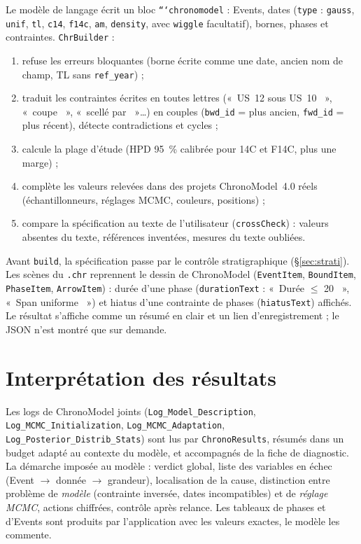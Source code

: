 \documentclass[11pt,a4paper]{article}
\providecommand{\og}{«~}\providecommand{\fg}{\unskip~»}
\newcommand{\code}[1]{\texttt{\small #1}}
\begin{document}
Le modèle de langage écrit un bloc \code{```chronomodel} : Events, dates (\code{type} : \code{gauss}, \code{unif},
\code{tl}, \code{c14}, \code{f14c}, \code{am}, \code{density}, avec \code{wiggle} facultatif), bornes, phases et
contraintes. \code{ChrBuilder} :
\begin{enumerate}[leftmargin=*]
\item refuse les erreurs bloquantes (borne écrite comme une date, ancien nom de champ, TL sans \code{ref\_year}) ;
\item traduit les contraintes écrites en toutes lettres (\og US~12 sous US~10 \fg, \og coupe \fg, \og scellé par
  \fg\dots) en couples (\code{bwd\_id} = plus ancien, \code{fwd\_id} = plus récent), détecte contradictions et cycles ;
\item calcule la plage d'étude (HPD 95~\% calibrée pour 14C et F14C, plus une marge) ;
\item complète les valeurs relevées dans des projets ChronoModel~4.0 réels (échantillonneurs, réglages MCMC,
  couleurs, positions) ;
\item compare la spécification au texte de l'utilisateur (\code{crossCheck}) : valeurs absentes du texte,
  références inventées, mesures du texte oubliées.
\end{enumerate}
Avant \code{build}, la spécification passe par le contrôle stratigraphique (§\ref{sec:strati}). Les scènes du
\code{.chr} reprennent le dessin de ChronoModel (\code{EventItem}, \code{BoundItem}, \code{PhaseItem},
\code{ArrowItem}) : durée d'une phase (\code{durationText} : \og Durée $\le$ 20 \fg, \og Span uniforme \fg) et hiatus
d'une contrainte de phases (\code{hiatusText}) affichés.
Le résultat s'affiche comme un résumé en clair et un lien d'enregistrement ; le JSON n'est montré que sur demande.

\section{Interprétation des résultats}

Les logs de ChronoModel joints (\code{Log\_Model\_Description}, \code{Log\_MCMC\_Initialization},
\code{Log\_MCMC\_Adaptation}, \code{Log\_Posterior\_Distrib\_Stats}) sont lus par \code{ChronoResults}, résumés dans un
budget adapté au contexte du modèle, et accompagnés de la fiche de diagnostic. La démarche imposée au modèle :
verdict global, liste des variables en échec (Event $\rightarrow$ donnée $\rightarrow$ grandeur), localisation de la
cause, distinction entre problème de \emph{modèle} (contrainte inversée, dates incompatibles) et de \emph{réglage
MCMC}, actions chiffrées, contrôle après relance. Les tableaux de phases et d'Events sont produits par
l'application avec les valeurs exactes, le modèle les commente.
\end{document}
